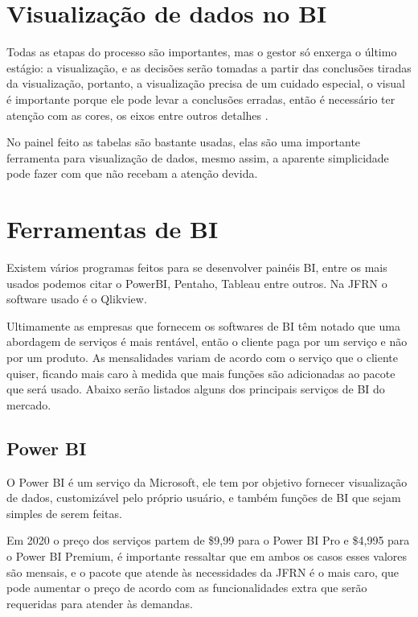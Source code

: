 \section{Visualização de dados no BI}

Todas as etapas do processo são importantes, mas o gestor só enxerga o último estágio: a visualização, e as decisões serão tomadas a partir das conclusões tiradas da visualização, portanto, a visualização precisa de um cuidado especial, o visual é importante porque ele pode levar a conclusões erradas, então é necessário ter atenção com as cores, os eixos entre outros detalhes \cite{claus1}.

No painel feito as tabelas são bastante usadas, elas são uma importante ferramenta para visualização de dados, mesmo assim, a aparente simplicidade pode fazer com que não recebam a atenção devida. 
\section{Ferramentas de BI}

Existem vários programas feitos para se desenvolver painéis BI, entre os mais usados podemos citar o PowerBI, Pentaho, Tableau entre outros. Na JFRN o software usado é o Qlikview. 

Ultimamente as empresas que fornecem os softwares de BI têm notado que uma abordagem de serviços é mais rentável, então o cliente paga por um serviço e não por um produto. As mensalidades variam de acordo com o serviço que o cliente quiser, ficando mais caro à medida que mais funções são adicionadas ao pacote que será usado. Abaixo serão listados alguns dos principais serviços de BI do mercado.

\subsection{Power BI}

O Power BI é um serviço da Microsoft, ele tem por objetivo fornecer visualização de dados, customizável pelo próprio usuário, e também funções de BI que sejam simples de serem feitas. 

Em 2020 o preço dos serviços partem de \$9,99 para o Power BI Pro e \$4,995 para o Power BI Premium, é importante ressaltar que em ambos os casos esses valores são mensais, e o pacote que atende às necessidades da JFRN é o mais caro, que pode aumentar o preço de acordo com as funcionalidades extra que serão requeridas para atender às demandas.

